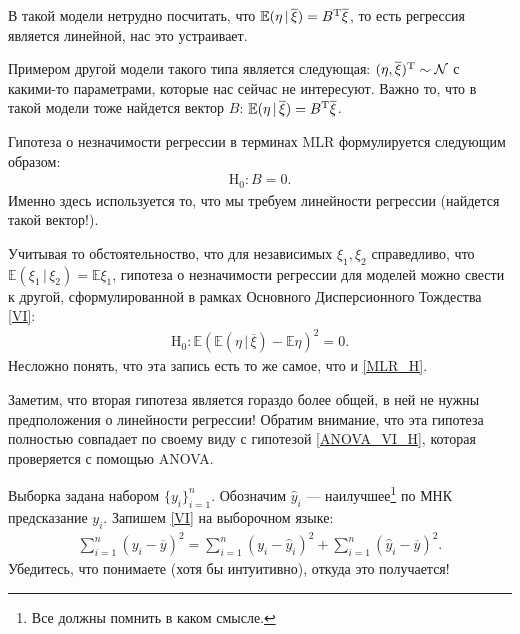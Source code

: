 
В такой модели нетрудно посчитать, что $\mathbb E(\eta \, | \, \overline \xi) = B^{\mathrm{T}} \overline \xi$,
то есть регрессия является линейной, нас это устраивает.

Примером другой модели такого типа является следующая: $(\eta, \overline \xi)^{\mathrm{T}} \sim \mathcal N$ с
какими-то параметрами, которые нас сейчас не интересуют. Важно то, что в такой модели
тоже найдется вектор $B$: $\mathbb E(\eta \, | \, \overline \xi) = B^{\mathrm{T}} \overline \xi$.

Гипотеза о незначимости регрессии в терминах MLR формулируется следующим образом:
\begin{gather}
    \label{MLR_H}
    \mathrm H_0: B = 0.
\end{gather}
Именно здесь используется то, что мы требуем линейности регрессии (найдется такой вектор!).

Учитывая то обстоятельноство, что для независимых $\xi_1, \xi_2$ справедливо, что $\mathbb E (\xi_1 \, | \, \xi_2) = \mathbb E\xi_1$,
гипотеза о незначимости регрессии для моделей можно свести к другой, сформулированной в рамках Основного Дисперсионного Тождества
\eqref{VI}:
\begin{gather}
    \label{MLR_VI_H}
    \mathrm H_0: \mathbb E(\mathbb E(\eta\, | \, \overline \xi) - \mathbb E \eta)^2 = 0.
\end{gather}
Несложно понять, что эта запись есть то же самое, что и \eqref{MLR_H}.

Заметим, что вторая гипотеза является гораздо более общей, в ней не нужны предположения о линейности регрессии!
Обратим внимание, что эта гипотеза полностью совпадает по своему виду с гипотезой \eqref{ANOVA_VI_H},
которая проверяется с помощью ANOVA. 

Выборка задана набором $\{y_i\}_{i=1}^n$. Обозначим $\hat y_i$ --- наилучшее\footnote{Все должны помнить в каком смысле.} по МНК предсказание $y_i$.
Запишем \eqref{VI} на выборочном языке:
\begin{gather}
    \label{VI_MLR}
    \sum_{i=1}^n (y_i - \overline y)^2 = \sum_{i=1}^n (y_{i} - \hat y_i)^2 + \sum_{i=1}^n (\hat y_i - \overline y)^2.
\end{gather}
Убедитесь, что понимаете (хотя бы интуитивно), откуда это получается!

